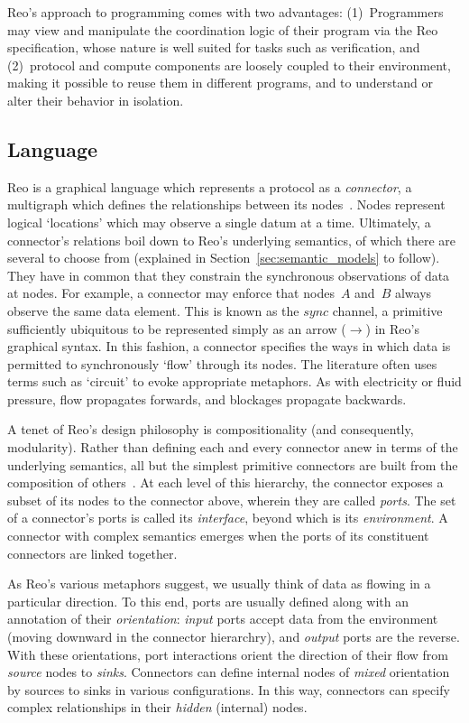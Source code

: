 Reo's approach to programming comes with two advantages: (1)~Programmers may view and manipulate the coordination logic of their program via the Reo specification, whose nature is well suited for tasks such as verification, and (2)~protocol and compute components are loosely coupled to their environment, making it possible to reuse them in different programs, and to understand or alter their behavior in isolation.


\subsection{Language}
\label{sec:reo_lang}
Reo is a graphical language which represents a protocol as a \textit{connector}, a multigraph which defines the relationships between its nodes~\cite{arbab2011puff}. Nodes represent logical `locations' which may observe a single datum at a time. Ultimately, a connector's relations boil down to Reo's underlying semantics, of which there are several to choose from (explained in Section~\ref{sec:semantic_models} to follow). They have in common that they constrain the synchronous observations of data at nodes. For example, a connector may enforce that nodes~$A$ and~$B$ always observe the same data element. This is known as the $sync$ channel, a primitive sufficiently ubiquitous to be represented simply as an arrow ($\longrightarrow$) in Reo's graphical syntax. In this fashion, a connector specifies the ways in which data is permitted to synchronously `flow' through its 	nodes. The literature often uses terms such as `circuit'  to evoke appropriate metaphors. As with electricity or fluid pressure, flow propagates forwards, and blockages propagate backwards.

A tenet of Reo's design philosophy is compositionality (and consequently, modularity). Rather than defining each and every connector anew in terms of the underlying semantics, all but the simplest primitive connectors are built from the composition of others~\cite{arbab2011puff}. At each level of this hierarchy, the connector exposes a subset of its nodes to the connector above, wherein they are called \textit{ports}. The set of a connector's ports is called its \textit{interface}, beyond which is its \textit{environment}. A connector with complex semantics emerges when the ports of its constituent connectors are linked together. 

As Reo's various metaphors suggest, we usually think of data as flowing in a particular direction. To this end, ports are usually defined along with an annotation of their \textit{orientation}: \textit{input} ports accept data from the environment (moving downward in the connector hierarchry), and \textit{output} ports are the reverse. With these orientations, port interactions orient the direction of their flow from \textit{source} nodes to \textit{sinks}. Connectors can define internal nodes of \textit{mixed} orientation by sources to sinks in various configurations. In this way, connectors can specify complex relationships in their \textit{hidden} (internal) nodes. 


